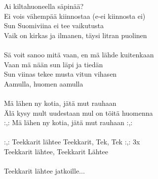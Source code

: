             Ai kiltahuoneella säpinää? \\
            Ei vois vähempää kiinnostaa (e-ei kiinnosta ei) \\
            Sun Suomiviina ei tee vaikutusta \\
            Vaik on kirkas ja ilmanen, täysi litran puolinen \\
\hspace{10mm} \\
            Sä voit sanoo mitä vaan, en mä lähde kuitenkaan \\
            Vaan mä nään sun läpi ja tiedän \\
            Sun viinas tekee musta vitun vihasen \\
            Aamulla, huomen aamulla \\
\hspace{10mm} \\
            Mä lähen ny kotia, jätä mut rauhaan \\
            Älä kysy mult uudestaan mul on töitä huomenna \\
            :,: Mä lähen ny kotia, jätä mut rauhaan :,: \\
\hspace{10mm} \\
            :,: Teekkarit lähtee Teekkarit, Tek, Tek :,: 3x \\
            Teekkarit lähtee, Teekkarit Lähtee \\
\hspace{10mm} \\
            Teekkarit lähtee jatkoille... \\
